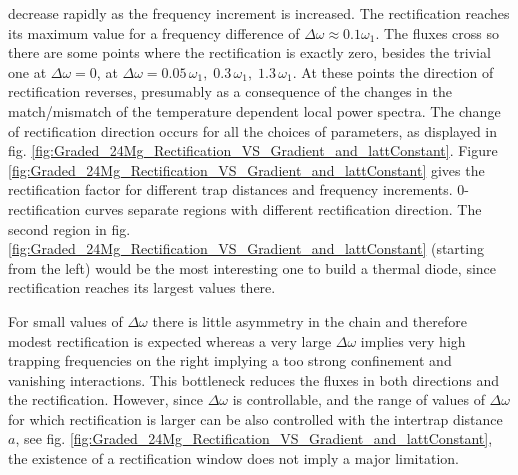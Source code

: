 decrease rapidly as the frequency increment  is increased.
The rectification reaches its maximum value for a frequency difference of $\Delta\omega \approx 0.1 \omega_1$. The fluxes cross so there are some points where the rectification is exactly zero, besides the trivial one at $\Delta\omega = 0$, at $\Delta\omega = 0.05\,\omega_1,\;0.3\,\omega_1,\;1.3\,\omega_1$. At these points the direction of rectification reverses, presumably as a consequence of the changes in the match/mismatch of the temperature dependent local power spectra.
The change of rectification direction occurs for all the choices of parameters, as displayed in fig. \ref{fig:Graded_24Mg_Rectification_VS_Gradient_and_lattConstant}. Figure \ref{fig:Graded_24Mg_Rectification_VS_Gradient_and_lattConstant} gives the rectification factor for different trap distances and frequency increments.  $0$-rectification curves separate regions with different rectification direction. The second region in fig. \ref{fig:Graded_24Mg_Rectification_VS_Gradient_and_lattConstant} (starting from the left) would be the most interesting one to build a thermal diode, since rectification reaches its largest values there.

{For small values of $\Delta \omega$ there is little asymmetry in the chain and therefore modest rectification is expected whereas a very large $\Delta \omega$ implies very high trapping frequencies on the right implying a too strong confinement and vanishing interactions. This bottleneck reduces the fluxes in both directions and  the rectification. However, since $\Delta \omega$ is controllable,
and the range of values of $\Delta \omega$ for which rectification is larger can be also controlled with the intertrap distance $a$, see fig. \ref{fig:Graded_24Mg_Rectification_VS_Gradient_and_lattConstant},
the existence of a rectification window
does not imply a major limitation.}

